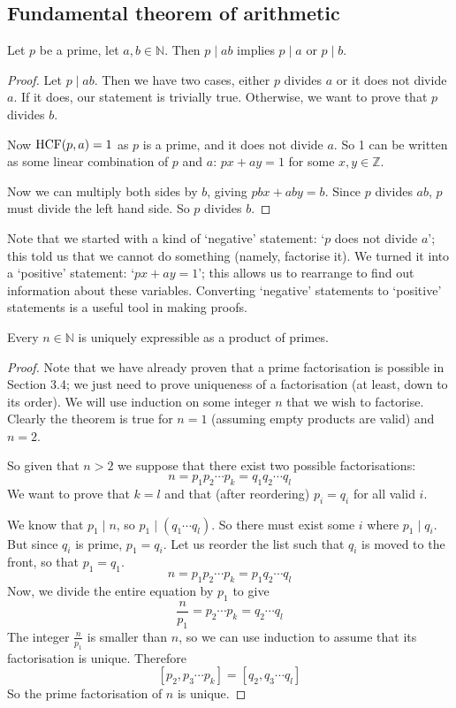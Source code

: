 \subsection{Fundamental theorem of arithmetic}
\begin{lemma}
	Let \(p\) be a prime, let \(a, b \in \mathbb N\).
	Then \(p \mid ab\) implies \(p \mid a\) or \(p \mid b\).
\end{lemma}
\begin{proof}
	Let \(p \mid ab\).
	Then we have two cases, either \(p\) divides \(a\) or it does not divide \(a\).
	If it does, our statement is trivially true.
	Otherwise, we want to prove that \(p\) divides \(b\).

	Now \(\operatorname{HCF}(p, a)=1\) as \(p\) is a prime, and it does not divide \(a\).
	So 1 can be written as some linear combination of \(p\) and \(a\): \(px + ay = 1\) for some \(x, y \in \mathbb Z\).

	Now we can multiply both sides by \(b\), giving \(pbx + aby = b\).
	Since \(p\) divides \(ab\), \(p\) must divide the left hand side.
	So \(p\) divides \(b\).
\end{proof}
Note that we started with a kind of `negative' statement: `\(p\) does not divide \(a\)'; this told us that we cannot do something (namely, factorise it).
We turned it into a `positive' statement: `\(px + ay = 1\)'; this allows us to rearrange to find out information about these variables.
Converting `negative' statements to `positive' statements is a useful tool in making proofs.

\begin{theorem}
	Every \(n \in \mathbb N\) is uniquely expressible as a product of primes.
\end{theorem}
\begin{proof}
	Note that we have already proven that a prime factorisation is possible in Section 3.4; we just need to prove uniqueness of a factorisation (at least, down to its order).
	We will use induction on some integer \(n\) that we wish to factorise.
	Clearly the theorem is true for \(n=1\) (assuming empty products are valid) and \(n=2\).

	So given that \(n > 2\) we suppose that there exist two possible factorisations:
	\[
		n = p_1 p_2 \cdots p_k = q_1 q_2 \cdots q_l
	\]
	We want to prove that \(k=l\) and that (after reordering) \(p_i = q_i\) for all valid \(i\).

	We know that \(p_1 \mid n\), so \(p_1 \mid (q_1 \cdots q_l)\).
	So there must exist some \(i\) where \(p_1 \mid q_i\).
	But since \(q_i\) is prime, \(p_1 = q_i\).
	Let us reorder the list such that \(q_i\) is moved to the front, so that \(p_1 = q_1\).
	\[
		n = p_1 p_2 \cdots p_k = p_1 q_2 \cdots q_l
	\]
	Now, we divide the entire equation by \(p_1\) to give
	\[
		\frac{n}{p_1} = p_2 \cdots p_k = q_2 \cdots q_l
	\]
	The integer \(\frac{n}{p_1}\) is smaller than \(n\), so we can use induction to assume that its factorisation is unique.
	Therefore
	\[
		[p_2, p_3 \cdots p_k] = [q_2, q_3 \cdots q_l]
	\]
	So the prime factorisation of \(n\) is unique.
\end{proof}

